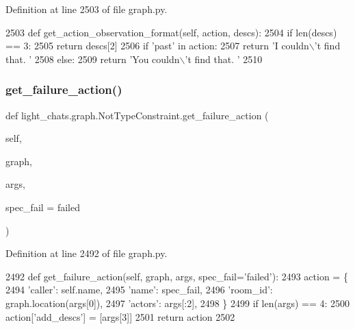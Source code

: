 Definition at line 2503 of file graph.\+py.


\begin{DoxyCode}
2503     \textcolor{keyword}{def }get\_action\_observation\_format(self, action, descs):
2504         \textcolor{keywordflow}{if} len(descs) == 3:
2505             \textcolor{keywordflow}{return} descs[2]
2506         \textcolor{keywordflow}{if} \textcolor{stringliteral}{'past'} \textcolor{keywordflow}{in} action:
2507             \textcolor{keywordflow}{return} \textcolor{stringliteral}{'I couldn\(\backslash\)'t find that. '}
2508         \textcolor{keywordflow}{else}:
2509             \textcolor{keywordflow}{return} \textcolor{stringliteral}{'You couldn\(\backslash\)'t find that. '}
2510 
\end{DoxyCode}
\mbox{\label{classlight__chats_1_1graph_1_1NotTypeConstraint_a006f37da6afe1dd06db790a6d19b07db}} 
\subsubsection{\texorpdfstring{get\+\_\+failure\+\_\+action()}{get\_failure\_action()}}
{\footnotesize\ttfamily def light\+\_\+chats.\+graph.\+Not\+Type\+Constraint.\+get\+\_\+failure\+\_\+action (\begin{DoxyParamCaption}\item[{}]{self,  }\item[{}]{graph,  }\item[{}]{args,  }\item[{}]{spec\+\_\+fail = {\ttfamily \textquotesingle{}failed\textquotesingle{}} }\end{DoxyParamCaption})}



Definition at line 2492 of file graph.\+py.


\begin{DoxyCode}
2492     \textcolor{keyword}{def }get\_failure\_action(self, graph, args, spec\_fail='failed'):
2493         action = \{
2494             \textcolor{stringliteral}{'caller'}: self.name,
2495             \textcolor{stringliteral}{'name'}: spec\_fail,
2496             \textcolor{stringliteral}{'room\_id'}: graph.location(args[0]),
2497             \textcolor{stringliteral}{'actors'}: args[:2],
2498         \}
2499         \textcolor{keywordflow}{if} len(args) == 4:
2500             action[\textcolor{stringliteral}{'add\_descs'}] = [args[3]]
2501         \textcolor{keywordflow}{return} action
2502 
\end{DoxyCode}


